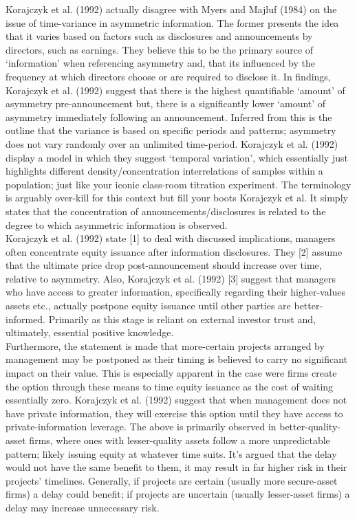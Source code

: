 \documentclass[11pt, english]{article}
\begin{document}
	Korajczyk et al. (1992) actually disagree with Myers and Majluf (1984) on the issue of time-variance in asymmetric information. The former presents the idea that it varies based on factors such as disclosures and announcements by directors, such as earnings. They believe this to be the primary source of ‘information’ when referencing asymmetry and, that its influenced by the frequency at which directors choose or are required to disclose it. In findings, Korajczyk et al. (1992) suggest that there is the highest quantifiable ‘amount’ of asymmetry pre-announcement but, there is a significantly lower ‘amount’ of asymmetry immediately following an announcement. Inferred from this is the outline that the variance is based on specific periods and patterns; asymmetry does not vary randomly over an unlimited time-period. Korajczyk et al. (1992) display a model in which they suggest ‘temporal variation’, which essentially just highlights different density/concentration interrelations of samples within a population; just like your iconic class-room titration experiment. The terminology is arguably over-kill for this context but fill your boots Korajczyk et al. It simply states that the concentration of announcements/disclosures is related to the degree to which asymmetric information is observed.\\

	Korajczyk et al. (1992) state [1] to deal with discussed implications, managers often concentrate equity issuance after information disclosures. They [2] assume that the ultimate price drop post-announcement should increase over time, relative to asymmetry. Also, Korajczyk et al. (1992) [3] suggest that managers who have access to greater information, specifically regarding their higher-values assets etc., actually postpone equity issuance until other parties are better- informed. Primarily as this stage is reliant on external investor trust and, ultimately, essential positive knowledge.\\

	Furthermore, the statement is made that more-certain projects arranged by management may be postponed as their timing is believed to carry no significant impact on their value. This is especially apparent in the case were firms create the option through these means to time equity issuance as the cost of waiting essentially zero. Korajczyk et al. (1992) suggest that when management does not have private information, they will exercise this option until they have access to private-information leverage. The above is primarily observed in better-quality- asset firms, where ones with lesser-quality assets follow a more unpredictable pattern; likely issuing equity at whatever time suits. It’s argued that the delay would not have the same benefit to them, it may result in far higher risk in their projects’ timelines. Generally, if projects are certain (usually more secure-asset firms) a delay could benefit; if projects are uncertain (usually lesser-asset firms) a delay may increase unnecessary risk.
\end{document}
